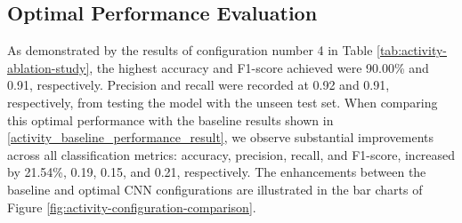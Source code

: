 \documentclass{l4proj}
\begin{document}
\subsection{Optimal Performance Evaluation}
As demonstrated by the results of configuration number 4 in Table \ref{tab:activity-ablation-study}, the highest accuracy and F1-score achieved were 90.00\% and 0.91, respectively. Precision and recall were recorded at 0.92 and 0.91, respectively, from testing the model with the unseen test set. When comparing this optimal performance with the baseline results shown in \ref{activity_baseline_performance_result}, we observe substantial improvements across all classification metrics: accuracy, precision, recall, and F1-score, increased by 21.54\%, 0.19, 0.15, and 0.21, respectively. The enhancements between the baseline and optimal CNN configurations are illustrated in the bar charts of Figure \ref{fig:activity-configuration-comparison}.
\end{document}
